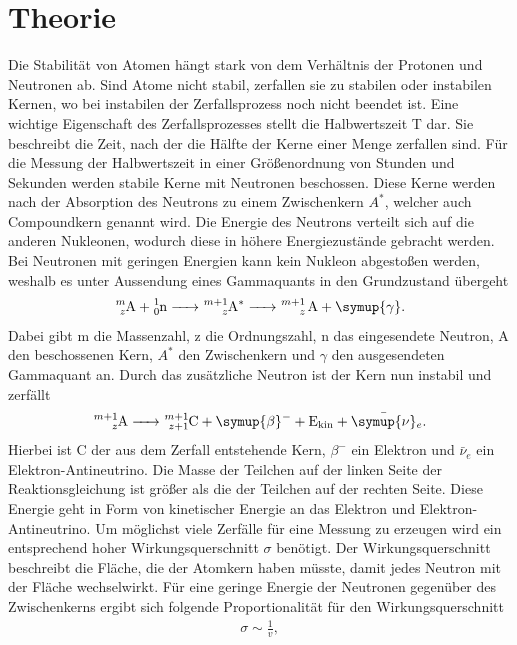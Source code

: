 \section{Theorie}\justifying
Die Stabilität von Atomen hängt stark von dem Verhältnis der Protonen und Neutronen ab. Sind
Atome nicht stabil, zerfallen sie zu stabilen oder instabilen Kernen, wo bei instabilen der Zerfallsprozess
noch nicht beendet ist.  Eine wichtige Eigenschaft des Zerfallsprozesses stellt die Halbwertszeit T
dar. Sie beschreibt die Zeit, nach der die Hälfte der Kerne einer Menge zerfallen sind.
Für die Messung der Halbwertszeit in einer Größenordnung von Stunden und Sekunden werden
stabile Kerne mit Neutronen beschossen. Diese Kerne werden nach der Absorption des Neutrons zu einem Zwischenkern $A^*$, welcher
auch Compoundkern genannt wird. Die Energie des Neutrons verteilt sich auf die anderen Nukleonen,
wodurch diese in höhere Energiezustände gebracht werden. Bei Neutronen mit geringen 
Energien kann kein Nukleon abgestoßen werden, weshalb es unter Aussendung eines Gammaquants in den Grundzustand übergeht \cite{V702}
\begin{align}
    \ce{_z^mA + _0^1n -> _z^{m+1}A^* -> _z^{m+1} A + \symup{\gamma}}. \label{eq:1} %
\end{align}
Dabei gibt m die Massenzahl, z die Ordnungszahl, n das eingesendete Neutron, A den beschossenen Kern,
$A^*$ den Zwischenkern und $\gamma$ den ausgesendeten Gammaquant an. Durch das zusätzliche
Neutron ist der Kern nun instabil und zerfällt \cite{V702}
\begin{align}
    \ce{_z^{m+1}A -> _{z+1}^{m+1}C + \symup{\beta}^- + E_{\text{kin}} + \bar{\symup{\nu}}_e } \label{eq:2}.
\end{align}
Hierbei ist C der aus dem Zerfall entstehende Kern, $\beta ^-$ ein Elektron und $\bar{\nu}_e$ ein Elektron-Antineutrino.
Die Masse der Teilchen auf der linken Seite der Reaktionsgleichung ist größer als die der Teilchen auf
der rechten Seite. Diese Energie geht in Form von kinetischer Energie an das Elektron und
Elektron-Antineutrino. Um möglichst viele Zerfälle für eine Messung zu erzeugen wird ein
entsprechend hoher Wirkungsquerschnitt $\sigma$ benötigt. Der Wirkungsquerschnitt beschreibt
die Fläche, die der Atomkern haben müsste, damit jedes Neutron mit der Fläche wechselwirkt.
Für eine geringe Energie der Neutronen gegenüber des Zwischenkerns ergibt sich folgende
Proportionalität für den Wirkungsquerschnitt \cite{V702}
\begin{align}
    \sigma \sim \frac{1}{v}, \label{eq:3}
\end{align}
